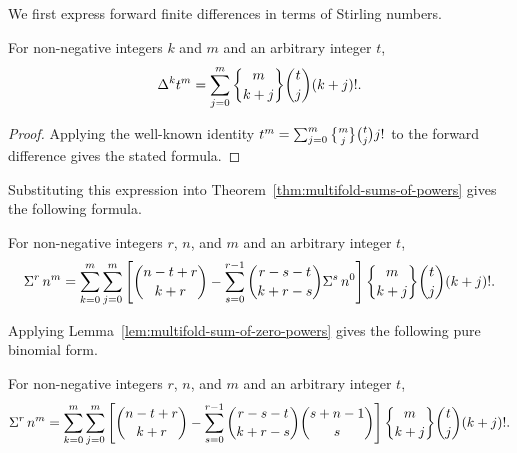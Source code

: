 We first express forward finite differences in terms of Stirling numbers.
\begin{lemma}
  \label{lem:finite-differences-via-stirling-numbers}
  For non-negative integers $k$ and $m$ and an arbitrary integer $t$,
  \begin{align*}
    \Delta^{k} t^{m} = \sum_{j=0}^{m} \stirlingii{m}{k+j} \binom{t}{j} (k+j)!.
  \end{align*}
  \begin{proof}
    Applying the well-known identity
    $t^{m} = \tsum_{j=0}^{m} \stirlingii{m}{j} \tbinom{t}{j} j!$
    to the forward difference gives the stated formula.
  \end{proof}
\end{lemma}
Substituting this expression into Theorem~\eqref{thm:multifold-sums-of-powers} gives the following formula.
\begin{proposition}
  \label{prop:multifold-stirling-sums}
  For non-negative integers $r$, $n$, and $m$ and an arbitrary integer $t$,
  \begin{align*}
    \KnuthRFoldSum{r}{n}{m}
    = \sum_{k=0}^{m} \sum_{j=0}^{m}
    \left[
      \binom{n-t+r}{k+r}
      -
      \sum_{s=0}^{r-1}
      \binom{r-s-t}{k+r-s}
      \KnuthRFoldSum{s}{n}{0}
    \right] \stirlingii{m}{k+j} \binom{t}{j} (k+j)!.
  \end{align*}
\end{proposition}
Applying Lemma~\eqref{lem:multifold-sum-of-zero-powers} gives the following pure binomial form.
\begin{proposition}
  \label{prop:multifold-stirling-binomial-sums}
  For non-negative integers $r$, $n$, and $m$ and an arbitrary integer $t$,
  \begin{align*}
    \KnuthRFoldSum{r}{n}{m}
    = \sum_{k=0}^{m} \sum_{j=0}^{m}
    \left[
      \binom{n-t+r}{k+r}
      -
      \sum_{s=0}^{r-1}
      \binom{r-s-t}{k+r-s}
      \binom{s+n-1}{s}
    \right] \stirlingii{m}{k+j} \binom{t}{j} (k+j)!.
  \end{align*}
\end{proposition}
